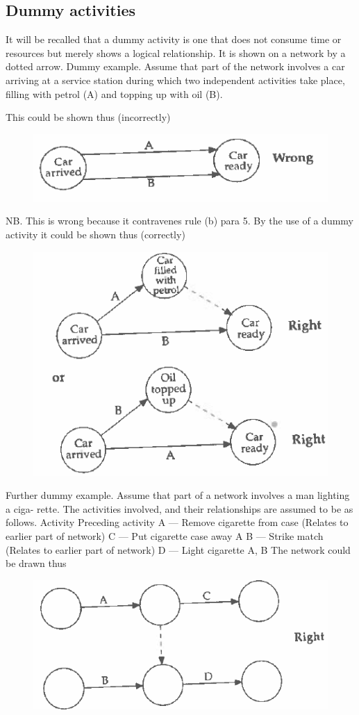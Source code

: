 \documentclass[]{report}
\begin{document}
\subsection*{Dummy activities }
It will be recalled that a dummy activity is one that does not consume time or resources 
but merely shows a logical relationship. It is shown on a network by a dotted arrow. 
Dummy example. Assume that part of the network involves a car arriving at a service 
station during which two independent activities take place, filling with petrol (A) and 
topping up with oil (B). 


This could be shown thus (incorrectly) 
\begin{figure}[h!]
\centering
\includegraphics[width=0.4\linewidth]{326-a}
\caption{}
\label{fig:326-a}
\end{figure}

NB. This is wrong because it contravenes rule (b) para 5. 
By the use of a dummy activity it could be shown thus (correctly) 
\begin{figure}[h!]
\centering
\includegraphics[width=0.47\linewidth]{326-b}
\caption{}
\label{fig:326-b}
\end{figure}

Further dummy example. Assume that part of a network involves a man lighting a ciga-
rette. The activities involved, and their relationships are assumed to be as follows. 
Activity Preceding activity 
A — Remove cigarette from case (Relates to earlier part of network) 
C — Put cigarette case away A 
B — Strike match (Relates to earlier part of network) 
D — Light cigarette A, B 
The network could be drawn thus 
\begin{figure}[h!]
\centering
\includegraphics[width=0.4\linewidth]{326-c}
\caption{}
\label{fig:326-c}
\end{figure}
\end{document}

